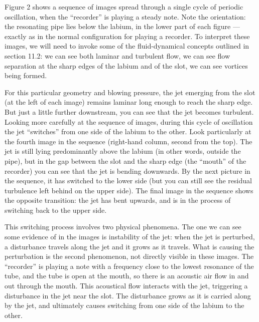   Figure 2 shows a sequence of images spread through a single cycle of periodic 
  oscillation, when the “recorder” is playing a steady note. Note the 
  orientation: the resonating pipe lies below the labium, in the lower part of 
  each figure --- exactly as in the normal configuration for playing a 
  recorder. To interpret these images, we will need to invoke some of the 
  fluid-dynamical concepts outlined in section 11.2: we can see both laminar 
  and turbulent flow, we can see flow separation at the sharp edges of the 
  labium and of the slot, we can see vortices being formed. 









  For this particular geometry and blowing pressure, the jet emerging from the 
  slot (at the left of each image) remains laminar long enough to reach the 
  sharp edge. But just a little further downstream, you can see that the jet 
  becomes turbulent. Looking more carefully at the sequence of images, during 
  this cycle of oscillation the jet “switches” from one side of the labium to 
  the other. Look particularly at the fourth image in the sequence (right-hand 
  column, second from the top). The jet is still lying predominantly above the 
  labium (in other words, outside the pipe), but in the gap between the slot 
  and the sharp edge (the “mouth” of the recorder) you can see that the jet is 
  bending downwards. By the next picture in the sequence, it has switched to 
  the lower side (but you can still see the residual turbulence left behind on 
  the upper side). The final image in the sequence shows the opposite 
  transition: the jet has bent upwards, and is in the process of switching back 
  to the upper side. 

  This switching process involves two physical phenomena. The one we can see 
  some evidence of in the images is instability of the jet: when the jet is 
  perturbed, a disturbance travels along the jet and it grows as it travels. 
  What is causing the perturbation is the second phenomenon, not directly 
  visible in these images. The “recorder” is playing a note with a frequency 
  close to the lowest resonance of the tube, and the tube is open at the mouth, 
  so there is an acoustic air flow in and out through the mouth. This 
  acoustical flow interacts with the jet, triggering a disturbance in the jet 
  near the slot. The disturbance grows as it is carried along by the jet, and 
  ultimately causes switching from one side of the labium to the other. 

